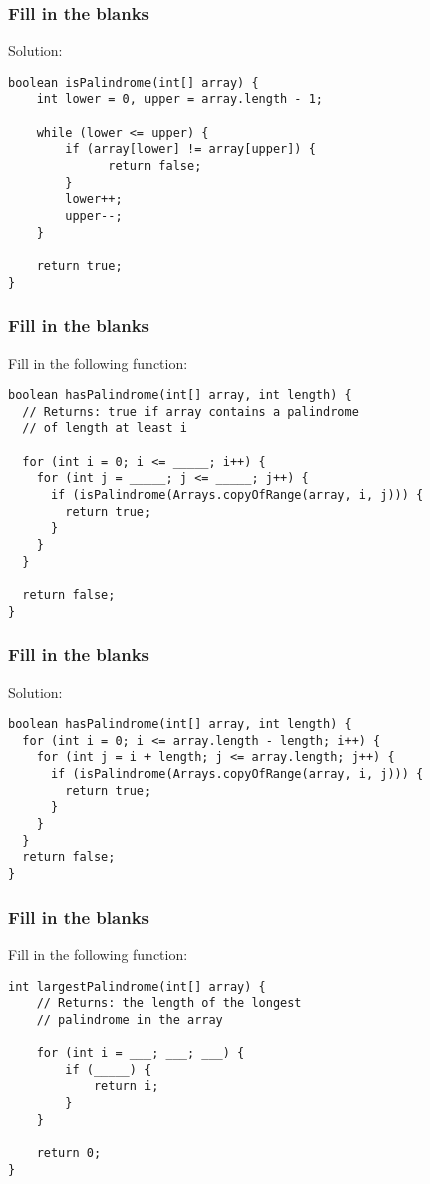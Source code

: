 \documentclass[9pt]{beamer}
\begin{document}
\begin{frame}[fragile]
  \frametitle{Fill in the blanks}
  Solution:
  \begin{lstlisting}
boolean isPalindrome(int[] array) {
    int lower = 0, upper = array.length - 1;

    while (lower <= upper) {
        if (array[lower] != array[upper]) {
              return false;
        }
        lower++;
        upper--;
    }

    return true;
}
  \end{lstlisting}
\end{frame}

\begin{frame}[fragile]
  \frametitle{Fill in the blanks}
  Fill in the following function:
  \begin{lstlisting}[xleftmargin=-10pt]
boolean hasPalindrome(int[] array, int length) {
  // Returns: true if array contains a palindrome
  // of length at least i

  for (int i = 0; i <= _____; i++) {
    for (int j = _____; j <= _____; j++) {
      if (isPalindrome(Arrays.copyOfRange(array, i, j))) {
        return true;
      }
    }
  }

  return false;
}
  \end{lstlisting}
\end{frame}

\begin{frame}[fragile]
  \frametitle{Fill in the blanks}
  Solution:
  \begin{lstlisting}[xleftmargin=-10pt]
boolean hasPalindrome(int[] array, int length) {
  for (int i = 0; i <= array.length - length; i++) {
    for (int j = i + length; j <= array.length; j++) {
      if (isPalindrome(Arrays.copyOfRange(array, i, j))) {
        return true;
      }
    }
  }
  return false;
}
  \end{lstlisting}
\end{frame}

\begin{frame}[fragile]
  \frametitle{Fill in the blanks}
  Fill in the following function:
  \begin{lstlisting}
int largestPalindrome(int[] array) {
    // Returns: the length of the longest
    // palindrome in the array

    for (int i = ___; ___; ___) {
        if (_____) {
            return i;
        }
    }

    return 0;
}
  \end{lstlisting}
\end{frame}
\end{document}
